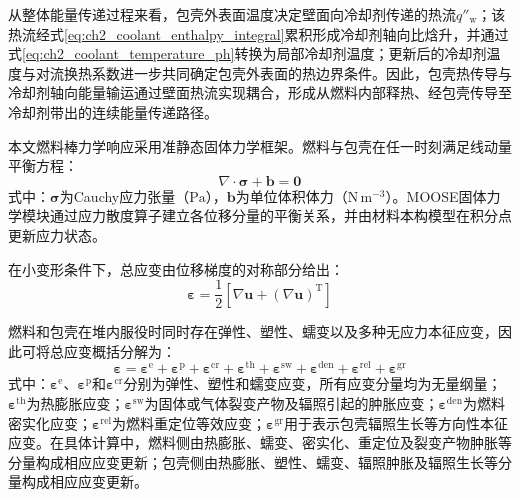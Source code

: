 从整体能量传递过程来看，包壳外表面温度决定壁面向冷却剂传递的热流$q''_{\mathrm w}$；该热流经式\eqref{eq:ch2_coolant_enthalpy_integral}累积形成冷却剂轴向比{\rarecharfont 焓}升，并通过式\eqref{eq:ch2_coolant_temperature_ph}转换为局部冷却剂温度；更新后的冷却剂温度与对流换热系数进一步共同确定包壳外表面的热边界条件。因此，包壳热传导与冷却剂轴向能量输运通过壁面热流实现耦合，形成从燃料内部释热、经包壳传导至冷却剂带出的连续能量传递路径。

\label{sec:ch2_mechanics_governing}


本文燃料棒力学响应采用准静态固体力学框架。燃料与包壳在任一时刻满足线动量平衡方程：
\begin{equation}
	\nabla\cdot\boldsymbol{\sigma}+\mathbf b=\mathbf 0
	\label{eq:ch2_quasistatic_equilibrium}
\end{equation}
\noindent 式中：$\boldsymbol{\sigma}$为Cauchy应力张量（$\mathrm{Pa}$），$\mathbf b$为单位体积体力（$\mathrm{N\,m^{-3}}$）。MOOSE固体力学模块通过应力散度算子建立各位移分量的平衡关系，并由材料本构模型在积分点更新应力状态\cite{halesBISONTheoryManual2016}。

在小变形条件下，总应变由位移梯度的对称部分给出：
\begin{equation}
	\boldsymbol{\varepsilon}
	=\frac{1}{2}
	\left[
		\nabla\mathbf u+\left(\nabla\mathbf u\right)^{\mathrm T}
		\right]
	\label{eq:ch2_small_strain}
\end{equation}

燃料和包壳在堆内服役时同时存在弹性、塑性、蠕变以及多种无应力本征应变，因此可将总应变概括分解为：
\begin{equation}
	\boldsymbol{\varepsilon}
	=\boldsymbol{\varepsilon}^{\mathrm{e}}
	+\boldsymbol{\varepsilon}^{\mathrm{p}}
	+\boldsymbol{\varepsilon}^{\mathrm{cr}}
	+\boldsymbol{\varepsilon}^{\mathrm{th}}
	+\boldsymbol{\varepsilon}^{\mathrm{sw}}
	+\boldsymbol{\varepsilon}^{\mathrm{den}}
	+\boldsymbol{\varepsilon}^{\mathrm{rel}}
	+\boldsymbol{\varepsilon}^{\mathrm{gr}}
	\label{eq:ch2_strain_decomposition}
\end{equation}
\noindent 式中：$\boldsymbol{\varepsilon}^{\mathrm{e}}$、$\boldsymbol{\varepsilon}^{\mathrm{p}}$和$\boldsymbol{\varepsilon}^{\mathrm{cr}}$分别为弹性、塑性和蠕变应变，所有应变分量均为无量纲量；$\boldsymbol{\varepsilon}^{\mathrm{th}}$为热膨胀应变；$\boldsymbol{\varepsilon}^{\mathrm{sw}}$为固体或气体裂变产物及辐照引起的肿胀应变；$\boldsymbol{\varepsilon}^{\mathrm{den}}$为燃料密实化应变；$\boldsymbol{\varepsilon}^{\mathrm{rel}}$为燃料重定位等效应变；$\boldsymbol{\varepsilon}^{\mathrm{gr}}$用于表示包壳辐照生长等方向性本征应变。在具体计算中，燃料侧由热膨胀、蠕变、密实化、重定位及裂变产物肿胀等分量构成相应应变更新；包壳侧由热膨胀、塑性、蠕变、辐照肿胀及辐照生长等分量构成相应应变更新。

